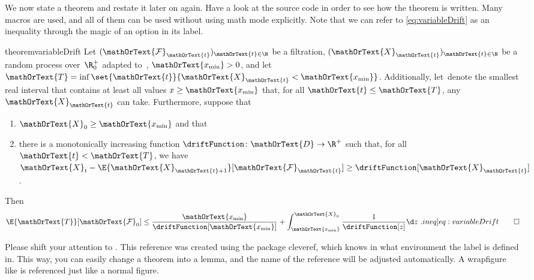 \newcommand*{\filtration}{\mathOrText{\mathcal{F}}}
\newcommand*{\randomProcess}{\mathOrText{X}}
\newcommand*{\timePoint}{\mathOrText{t}}
\newcommand*{\target}{\mathOrText{x_{\min}}}
\newcommand*{\firstHittingTime}{\mathOrText{T}}
\newcommand*{\functionDomain}{\mathOrText{D}}
We now state a theorem and restate it later on again. Have a look at the source code in order to see how the theorem is written. Many macros are used, and all of them can be used without using math mode explicitly. Note that we can refer to \cref{eq:variableDrift} as an inequality through the magic of an option in its label.
\begin{restatable}{theorem}{variableDrift}
    \label{thm:variableDrift}
    Let $(\filtration_\timePoint)_{\timePoint \in \N}$ be a filtration, $(\randomProcess_\timePoint)_{\timePoint \in \N}$ be a random process over~$\R^+_0$ adapted to~\filtration, $\target > 0$, and let $\firstHittingTime = \inf\set{\timePoint}{\randomProcess_\timePoint < \target}$. Additionally, let~\functionDomain denote the smallest real interval that contains at least all values $x \geq \target$ that, for all $\timePoint \leq \firstHittingTime$, any $\randomProcess_\timePoint$ can take. Furthermore, suppose that
    \begin{enumerate}
        \item $\randomProcess_0 \geq \target$ and that
        
        \item there is a monotonically increasing function $\driftFunction\colon \functionDomain \to \R^+$ such that, for all $\timePoint < \firstHittingTime$, we have $\randomProcess_t - \E{\randomProcess_{\timePoint + 1}}[\filtration_\timePoint] \geq \driftFunction[\randomProcess_\timePoint]$.
    \end{enumerate}
    Then
    \begin{equation}
        \E{\firstHittingTime}[\filtration_0] \leq \frac{\target}{\driftFunction[\target]} + \int^{\randomProcess_0}_{\target} \frac{1}{\driftFunction[z]} \d z\ .\label[ineq]{eq:variableDrift}\qedhere
    \end{equation}
\end{restatable}

Please shift your attention to . This reference was created using the package \textsf{cleveref}, which knows in what environment the label is defined in. This way, you can easily change a theorem into a lemma, and the name of the reference will be adjusted automatically. A wrapfigure like  is referenced just like a normal figure.

